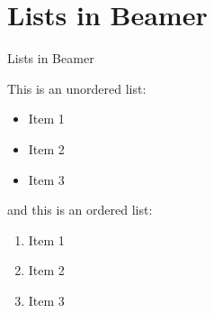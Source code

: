
\section{Lists in Beamer}
\begin{frame}{Lists in Beamer}
	
	This is an unordered list:
	\begin{itemize}
		\item Item 1
		\item Item 2
		\item Item 3
	\end{itemize}
	
	and this is an ordered list:
	\begin{enumerate}
		\item Item 1
		\item Item 2
		\item Item 3
	\end{enumerate}
	
\end{frame}

%
